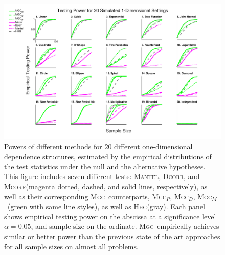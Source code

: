 \documentclass[11pt]{article}
\providecommand{\sct}[1]{{\normalfont\textsc{#1}}}
\newcommand{\Mgc}{\sct{Mgc}}
\newcommand{\Mgcp}{\sct{Mgc$_P$}}
\newcommand{\Mgcd}{\sct{Mgc$_D$}}
\newcommand{\Mgcm}{\sct{Mgc$_M$}}
\newcommand{\Hhg}{\sct{Hhg}}
\newcommand{\Dcorr}{\sct{Dcorr}}
\newcommand{\Mcorr}{\sct{Mcorr}}
\newcommand{\Mantel}{\sct{Mantel}}
\begin{document}
\begin{figure}[htbp]
\includegraphics[width=1.0\textwidth]{Figures/Fig1DPowerAll}
\caption{
Powers of different methods for $20$ different one-dimensional dependence structures, estimated by the empirical distributions of the test statistics under the null and the alternative hypotheses.
This figure includes seven different tests: \Mantel, \Dcorr, and \Mcorr  (magenta dotted, dashed, and solid lines, respectively), as well as their corresponding \Mgc~counterparts, \Mgcp, \Mgcd, \Mgcm~(green with same line styles), as well as \Hhg (gray).
Each panel shows empirical testing power on the abscissa at a significance level $\alpha=0.05$, and sample size on the ordinate.
\Mgc~empirically achieves similar or better power than the previous state of the art approaches for all sample sizes on almost all problems.}
\label{f:1DAll}
\end{figure}
\end{document}

